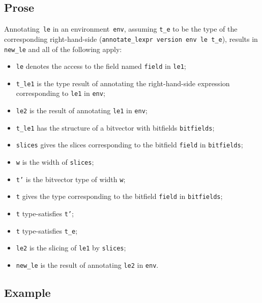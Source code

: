 \documentclass{book}
\begin{document}
\begin{itemize}
    \subsection{Prose}
   Annotating~\texttt{le} in an environment~\texttt{env}, assuming
\texttt{t\_e} to be the type of the corresponding right-hand-side
(\texttt{annotate\_lexpr version env le t\_e}), results in \texttt{new\_le} and
all of the following apply:
   \begin{itemize}
   \item \texttt{le} denotes the access to the field named \texttt{field} in \texttt{le1};
   \item \texttt{t\_le1} is the type result of annotating the right-hand-side expression corresponding to \texttt{le1} in \texttt{env};
   \item \texttt{le2} is the result of annotating \texttt{le1} in \texttt{env};
   \item \texttt{t\_le1} has the structure of a bitvector with bitfields \texttt{bitfields};
   \item \texttt{slices} gives the slices corresponding to the bitfield \texttt{field} in
      \texttt{bitfields};
   \item \texttt{w} is the width of \texttt{slices};
   \item \texttt{t'} is the bitvector type of width \texttt{w};
   \item \texttt{t} gives the type corresponding to the bitfield \texttt{field} in
      \texttt{bitfields};
   \item \texttt{t} type-satisfies \texttt{t'};
   \item \texttt{t} type-satisfies \texttt{t\_e};
   \item \texttt{le2} is the slicing of \texttt{le1} by \texttt{slices};
   \item \texttt{new\_le} is the result of annotating \texttt{le2} in \texttt{env}.
   \end{itemize}

  \subsection{Example}



\begin{emptyformal}

\end{emptyformal}
\end{itemize}
\end{document}
